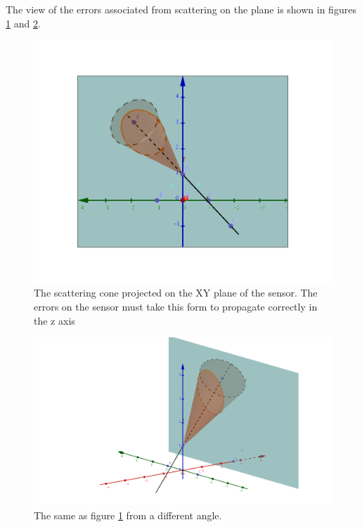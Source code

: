 The view of the errors associated from scattering on the plane is shown in figures \ref{fig:ScatFrame1} and \ref{fig:ScatFrame2}. 

\begin{figure}[H]
\centering
\includegraphics[width=1.0\linewidth]{figures/scatterDownZProjection.png}
\caption{The scattering cone projected on the XY plane of the sensor. The errors on the sensor must take this form to propagate correctly in the z axis}
\label{fig:ScatFrame1}
\end{figure}

\begin{figure}[H]
\centering
\includegraphics[width=1.0\linewidth]{figures/prop600GoodOffSensor.png}
\caption{The same as figure \ref{fig:ScatFrame1} from a different angle.}
\label{fig:ScatFrame2}
\end{figure}

